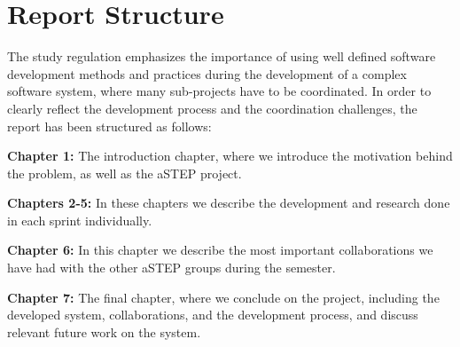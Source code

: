 \section{Report Structure} \label{sec:report_structure}
The study regulation emphasizes the importance of using well defined software development methods and practices during the development of a complex software system, where many sub-projects have to be coordinated. In order to clearly reflect the development process and the coordination challenges, the report has been structured as follows:

\textbf{Chapter 1:} The introduction chapter, where we introduce the motivation behind the problem, as well as the aSTEP project.

\textbf{Chapters 2-5:} In these chapters we describe the development and research done in each sprint individually.

\textbf{Chapter 6:} In this chapter we describe the most important collaborations we have had with the other aSTEP groups during the semester.

\textbf{Chapter 7:} The final chapter, where we conclude on the project, including the developed system, collaborations, and the development process, and discuss relevant future work on the system.
